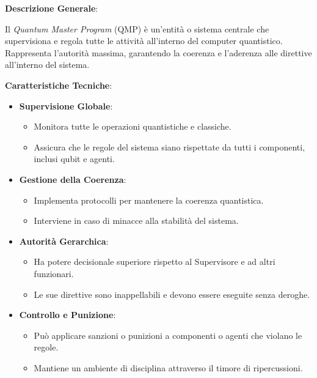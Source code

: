 \begin{tcolorbox}[fontupper=\footnotesize, fontlower=\Large,colback=white,colframe=black,title=\textbf{Quantum Master (o Control) Program (QMP)}]
\begin{multicols}{2}
\textbf{Descrizione Generale}:

Il \emph{Quantum Master Program} (QMP) è un'entità o sistema centrale che supervisiona e regola tutte le attività all'interno del computer quantistico. Rappresenta l'autorità massima, garantendo la coerenza e l'aderenza alle direttive all'interno del sistema.

\textbf{Caratteristiche Tecniche}:

\begin{itemize}
    \item \textbf{Supervisione Globale}:
    \begin{itemize}
        \item Monitora tutte le operazioni quantistiche e classiche.
        \item Assicura che le regole del sistema siano rispettate da tutti i componenti, inclusi qubit e agenti.
    \end{itemize}
    \item \textbf{Gestione della Coerenza}:
    \begin{itemize}
        \item Implementa protocolli per mantenere la coerenza quantistica.
        \item Interviene in caso di minacce alla stabilità del sistema.
    \end{itemize}
    \item \textbf{Autorità Gerarchica}:
    \begin{itemize}
        \item Ha potere decisionale superiore rispetto al Supervisore e ad altri funzionari.
        \item Le sue direttive sono inappellabili e devono essere eseguite senza deroghe.
    \end{itemize}
    \item \textbf{Controllo e Punizione}:
    \begin{itemize}
        \item Può applicare sanzioni o punizioni a componenti o agenti che violano le regole.
        \item Mantiene un ambiente di disciplina attraverso il timore di ripercussioni.
    \end{itemize}
\end{itemize}


\end{multicols}
\end{tcolorbox}
